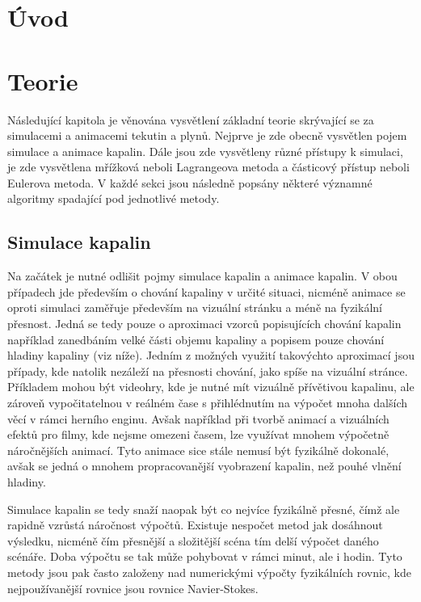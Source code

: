 \chapter{Úvod}
\label{chapter:uvod}

\chapter{Teorie}
Následující kapitola je věnována vysvětlení základní teorie skrývající se za simulacemi a animacemi tekutin a plynů. Nejprve je zde obecně vysvětlen pojem simulace a animace kapalin. Dále jsou zde vysvětleny různé přístupy k simulaci, je zde vysvětlena mřížková neboli Lagrangeova metoda a částicový přístup neboli Eulerova metoda. V každé sekci jsou následně popsány některé významné algoritmy spadající pod jednotlivé metody.

\label{chapter:teorie}
\section{Simulace kapalin}
Na začátek je nutné odlišit pojmy simulace kapalin a animace kapalin. V obou případech jde především o chování kapaliny v určité situaci, nicméně animace se oproti simulaci zaměřuje především na vizuální stránku a méně na fyzikální přesnost. Jedná se tedy pouze o aproximaci vzorců popisujících chování kapalin například zanedbáním velké části objemu kapaliny a popisem pouze chování hladiny kapaliny (viz níže). Jedním z možných využití takovýchto aproximací jsou případy, kde natolik nezáleží na přesnosti chování, jako spíše na vizuální stránce. Příkladem mohou být videohry, kde je nutné mít vizuálně přívětivou kapalinu, ale zároveň vypočitatelnou v reálném čase s přihlédnutím na výpočet mnoha dalších věcí v rámci herního enginu. Avšak například při tvorbě animací a vizuálních efektů pro filmy, kde nejsme omezeni časem, lze využívat mnohem výpočetně náročnějších animací. Tyto animace sice stále nemusí být fyzikálně dokonalé, avšak se jedná o mnohem propracovanější vyobrazení kapalin, než pouhé vlnění hladiny.

Simulace kapalin se tedy snaží naopak být co nejvíce fyzikálně přesné, čímž ale rapidně vzrůstá náročnost výpočtů. Existuje nespočet metod jak dosáhnout výsledku, nicméně čím přesnější a složitější scéna tím delší výpočet daného scénáře. Doba výpočtu se tak může pohybovat v rámci minut, ale i hodin. Tyto metody jsou pak často založeny nad numerickými výpočty fyzikálních rovnic, kde nejpoužívanější rovnice jsou rovnice Navier-Stokes.
